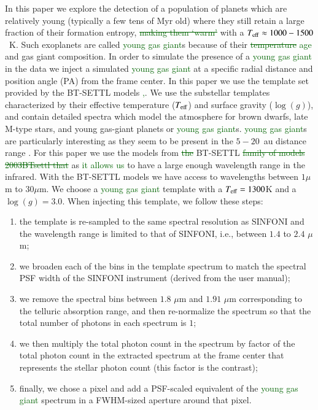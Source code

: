 \documentclass{aa}
\newcommand{\newchange}[1]{\textcolor{darkgreen}{#1}}
\begin{document}
In this paper we explore the detection of a population of planets which are relatively young (typically a few tens of Myr old) where they still retain a large fraction of their formation entropy, \newchange{\sout{making them `warm'}} with a $T_{\rm eff}\approx 1000 - 1500$~K.
Such exoplanets are called \newchange{young gas giant}s because of their \newchange{\sout{temperature} age} and gas giant composition.
In order to simulate the presence of a \newchange{young gas giant} in the data we inject a simulated \newchange{young gas giant} at a specific radial distance and position angle (PA) from the frame center.
In this paper we use the template set provided by the BT-SETTL models \citep{1997Allard, 2011Allard,2003BTsettl}\newchange{,\citep[][]{2003BTsettl}}. 
We use the substellar templates characterized by their effective temperature ($T_{\rm{eff}}$) and surface gravity ($\log(g)$), and contain detailed spectra which model the atmosphere for brown dwarfs, late M-type stars, and young gas-giant planets or \newchange{young gas giant}s.
\newchange{young gas giant}s are particularly interesting as they seem to be present in the $5-20$~au distance range \cite{2016Bryan}.
For this paper we use the models from \newchange{\sout{the}} BT-SETTL \newchange{\sout{family of models 2003BTsettl that}} as \newchange{it allows us} to have a large enough wavelength range in the infrared. 
With the BT-SETTL models we have access to wavelengths between $1\mu$m to $30\mu$m.
We choose a \newchange{young gas giant} template with a $T_{\rm eff} = 1300$K and a $\log(g)=3.0$.
When injecting this template, we follow these steps:
\begin{enumerate}
    \item the template is re-sampled to the same spectral resolution as SINFONI and the wavelength range is limited to that of SINFONI, i.e., between $1.4$ to $2.4$ $\mu$m;
    \item we broaden each of the bins in the template spectrum to match the spectral PSF width of the SINFONI instrument (derived from the user manual);
    \item we remove the spectral bins between $1.8$ $\mu$m and $1.91$ $\mu$m corresponding to the telluric absorption range, and then re-normalize the spectrum so that the total number of photons in each spectrum is $1$;
    \item we then multiply the total photon count in the spectrum by factor of the total photon count in the extracted spectrum at the frame center that represents the stellar photon count (this factor is the contrast);
    \item finally, we chose a pixel and add a PSF-scaled equivalent of the \newchange{young gas giant} spectrum in a FWHM-sized aperture around that pixel.
\end{enumerate}
\end{document}
